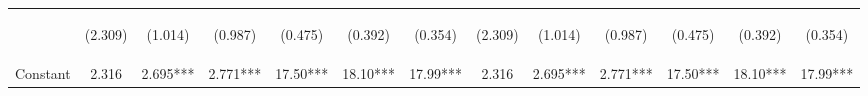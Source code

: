 \documentclass[]{article}
\begin{document}
\begin{center}
\begin{tabular}{lcccccccccccc}
\vspace{4pt} & \begin{footnotesize}(2.309)\end{footnotesize} & \begin{footnotesize}(1.014)\end{footnotesize} & \begin{footnotesize}(0.987)\end{footnotesize} & \begin{footnotesize}(0.475)\end{footnotesize} & \begin{footnotesize}(0.392)\end{footnotesize} & \begin{footnotesize}(0.354)\end{footnotesize} & \begin{footnotesize}(2.309)\end{footnotesize} & \begin{footnotesize}(1.014)\end{footnotesize} & \begin{footnotesize}(0.987)\end{footnotesize} & \begin{footnotesize}(0.475)\end{footnotesize} & \begin{footnotesize}(0.392)\end{footnotesize} & \begin{footnotesize}(0.354)\end{footnotesize} \\
Constant & 2.316 & 2.695*** & 2.771*** & 17.50*** & 18.10*** & 17.99*** & 2.316 & 2.695*** & 2.771*** & 17.50*** & 18.10*** & 17.99*** \\

\end{tabular}
\end{center}
\end{document}
